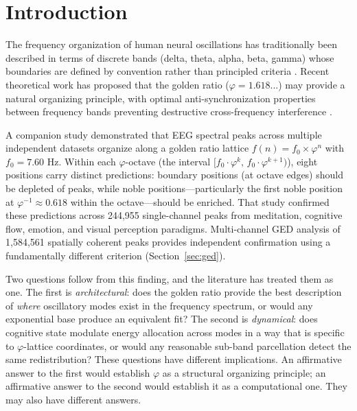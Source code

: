 \documentclass[11pt,a4paper]{article}
\newcommand{\phisym}{\varphi}
\newcommand{\fzero}{f_0}
\begin{document}
\section{Introduction}
\label{sec:intro}

The frequency organization of human neural oscillations has traditionally been described in terms of discrete bands (delta, theta, alpha, beta, gamma) whose boundaries are defined by convention rather than principled criteria \parencite{buzsaki2013scaling, klimesch2013algorithm}. Recent theoretical work has proposed that the golden ratio ($\phisym = 1.618...$) may provide a natural organizing principle, with optimal anti-synchronization properties between frequency bands preventing destructive cross-frequency interference \parencite{pletzer2010golden, kramer2022golden}.

A companion study \parencite{lacy2026golden} demonstrated that EEG spectral peaks across multiple independent datasets organize along a golden ratio lattice $f(n) = \fzero \times \phisym^n$ with $\fzero = 7.60$ Hz. Within each $\phisym$-octave (the interval $[\fzero \cdot \phisym^k, \, \fzero \cdot \phisym^{k+1})$), eight positions carry distinct predictions: boundary positions (at octave edges) should be depleted of peaks, while noble positions---particularly the first noble position at $\phisym^{-1} \approx 0.618$ within the octave---should be enriched. That study confirmed these predictions across 244,955 single-channel peaks from meditation, cognitive flow, emotion, and visual perception paradigms. Multi-channel GED analysis of 1,584,561 spatially coherent peaks provides independent confirmation using a fundamentally different criterion (Section~\ref{sec:ged}).

Two questions follow from this finding, and the literature has treated them as one. The first is \emph{architectural}: does the golden ratio provide the best description of \emph{where} oscillatory modes exist in the frequency spectrum, or would any exponential base produce an equivalent fit? The second is \emph{dynamical}: does cognitive state modulate energy allocation across modes in a way that is specific to $\phisym$-lattice coordinates, or would any reasonable sub-band parcellation detect the same redistribution? These questions have different implications. An affirmative answer to the first would establish $\phisym$ as a structural organizing principle; an affirmative answer to the second would establish it as a computational one. They may also have different answers.
\end{document}
